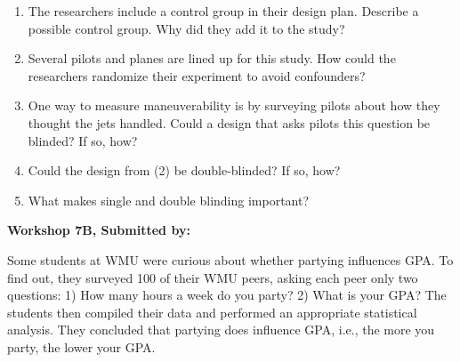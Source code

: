 \documentclass[11pt]{book}\usepackage[]{graphicx}\usepackage[]{color}
\begin{document}
\begin{exercises}
\begin{exercise}
\begin{enumerate}
  \item The researchers include a control group in their design plan. Describe a possible control group. Why did they add it to the study?
  \item Several pilots and planes are lined up for this study. How could the researchers randomize their experiment to avoid confounders?
  \item One way to measure maneuverability is by surveying pilots about how they thought the jets handled. Could a design that asks pilots this question be blinded? If so, how?
  \item Could the design from (2) be double-blinded? If so, how?
  \item What makes single and double blinding important?
\end{enumerate}
\end{exercise}
\begin{solution}  %

\end{solution}

\clearpage

    \begin{exercise}  %

    \begin{center}
\begin{flushleft}\textbf{\large \hfill Workshop 7B, Submitted by: }\end{flushleft}

\end{center}

Some students at WMU were curious about whether partying influences GPA. To find out, they surveyed 100 of their WMU peers, asking each peer only two questions: 1) How many hours a week do you party? 2) What is your GPA? The students then compiled their data and performed an appropriate statistical analysis. They concluded that partying does influence GPA, i.e., the more you party, the lower your GPA.


\end{exercise}
\end{exercises}
\end{document}

